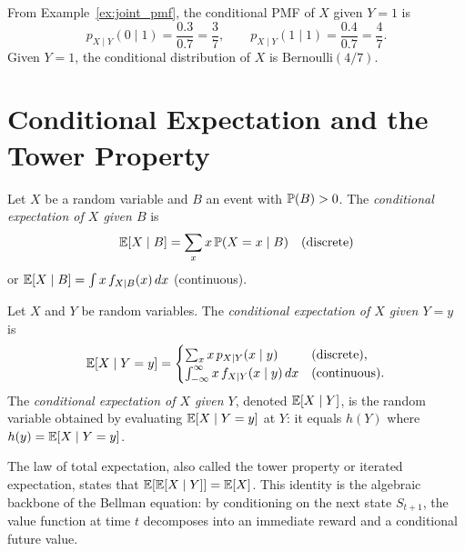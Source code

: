 \documentclass[11pt,a4paper]{article}
\begin{document}
\begin{example}
\label{ex:cond_pmf_compute}
From Example~\ref{ex:joint_pmf}, the conditional PMF of $X$ given
$Y = 1$ is
\[
    p_{X \mid Y}(0 \mid 1) = \frac{0.3}{0.7} = \frac{3}{7}, \qquad
    p_{X \mid Y}(1 \mid 1) = \frac{0.4}{0.7} = \frac{4}{7}.
\]
Given $Y = 1$, the conditional distribution of $X$ is
$\mathrm{Bernoulli}(4/7)$.
\end{example}


\section{Conditional Expectation and the Tower Property}
\label{sec:cond_exp}

\begin{definition}
\label{def:cond_exp_event}
Let $X$ be a random variable and $B$ an event with $\mathbb{P}(B) > 0$. The
\emph{conditional expectation of $X$ given $B$} is
\[
    \mathbb{E}[X \mid B] = \sum_x x \, \mathbb{P}(X = x \mid B)
    \quad \text{(discrete)}
\]
or $\mathbb{E}[X \mid B] = \int x \, f_{X \mid B}(x)\,dx$ (continuous).
\end{definition}

\begin{definition}
\label{def:cond_exp_rv}
Let $X$ and $Y$ be random variables. The \emph{conditional expectation
of $X$ given $Y = y$} is
\[
    \mathbb{E}[X \mid Y = y] = \begin{cases}
    \sum_x x \, p_{X \mid Y}(x \mid y) & \text{(discrete)}, \\
    \int_{-\infty}^{\infty} x \, f_{X \mid Y}(x \mid y)\,dx
    & \text{(continuous)}.
    \end{cases}
\]
The \emph{conditional expectation of $X$ given $Y$}, denoted
$\mathbb{E}[X \mid Y]$, is the random variable obtained by evaluating
$\mathbb{E}[X \mid Y = y]$ at $Y$: it equals $h(Y)$ where $h(y) = \mathbb{E}[X \mid Y = y]$.
\end{definition}

\begin{keyresult}[title={Law of Total Expectation (Tower Property)}]
The law of total expectation, also called the tower property or iterated
expectation, states that $\mathbb{E}[\mathbb{E}[X \mid Y]] = \mathbb{E}[X]$. This identity is
the algebraic backbone of the Bellman equation: by conditioning on the
next state $S_{t+1}$, the value function at time $t$ decomposes into an
immediate reward and a conditional future value.
\end{keyresult}
\end{document}
